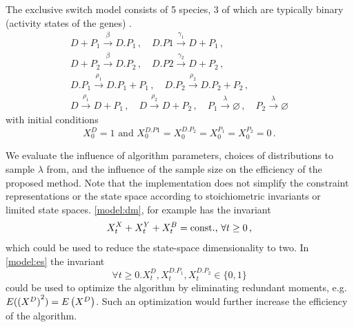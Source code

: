
\begin{model}\label{model:es}
	The exclusive switch model consists of \num{5} species, \num{3} of which are typically binary (activity states of the genes) \parencite{loinger2007stochastic}.
\begin{gather*}
	D + P_1 \xrightarrow{\beta} D.P_1\,,\quad
	D.P1 \xrightarrow{\gamma_1} D + P_1  \,,\\
	D + P_2 \xrightarrow{\beta} D.P_2 \,,\quad
	D.P2 \xrightarrow{\gamma_2} D + P_2 \,,\\
	D.P_1 \xrightarrow{\rho_1} D.P_1 + P_1\,, \quad
    D.P_2 \xrightarrow{\rho_2} D.P_2 + P_2\,,\\
	D \xrightarrow{\rho_1} D + P_1\,,\quad
	D \xrightarrow{\rho_2} D + P_2\,,  \quad
	P_1 \xrightarrow{\lambda}\varnothing  \,,\quad
    P_2\xrightarrow{\lambda} \varnothing
\end{gather*}
with initial conditions 
	\[X^D_0=1 \text{ and } X^{D.P1}_0=X^{D.{P_2}}_0=X^{P_1}_0=X^{P_2}_0=0\,.\]
\end{model}

We evaluate the influence of algorithm parameters, choices of distributions
to sample $\lambda$ from, and the influence of the sample size on the efficiency of
the proposed method.
Note that the implementation does not simplify the constraint representations
or the state space according to stoichiometric invariants or limited
state spaces.
\autoref{model:dm}, for example has the invariant 
\[
	X^X_t+X^Y_t+X^B_t=\text{const.}$, $\forall t\geq 0\,,
\]
which could be used to reduce the state-space dimensionality to two.
In \autoref{model:es} the invariant 
\[
	\forall t\geq 0.X^D_t,X^{D.{P_1}}_t,X^{D.{P_2}}_t\in\{0,1\}
\]
could be used to optimize the algorithm by eliminating redundant moments, e.g.\ ${E}({(X^D)}^2)={E}\left(X^D\right)$.
Such an optimization would further increase the efficiency of the algorithm.




